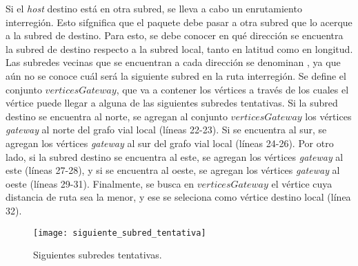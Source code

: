 Si el \textit{host} destino está en otra subred, se lleva a cabo un
enrutamiento interregión. Esto sifgnifica que el paquete debe pasar a otra
subred que lo acerque a la subred de destino. Para esto, se debe conocer en qué
dirección se encuentra la subred de destino respecto a la subred local, tanto
en latitud como en longitud. Las subredes vecinas que se encuentran a cada
dirección se denominan , ya que aún no
se conoce cuál será la siguiente subred en la ruta interregión. Se define el
conjunto $verticesGateway$, que va a contener los vértices a través de los
cuales el vértice puede llegar a alguna de las siguientes subredes tentativas.
Si la subred destino se encuentra al norte, se agregan al conjunto
$verticesGateway$ los vértices \textit{gateway} al norte del grafo vial local
(líneas 22-23). Si se encuentra al sur, se agregan los vértices
\textit{gateway} al sur del grafo vial local (líneas 24-26). Por otro lado, si
la subred destino se encuentra al este, se agregan los vértices
\textit{gateway} al este (líneas 27-28), y si se encuentra al oeste, se agregan
los vértices \textit{gateway} al oeste (líneas 29-31). Finalmente, se busca en
$verticesGateway$ el vértice cuya distancia de ruta sea la menor, y ese se
seleciona como vértice destino local (línea 32).

\begin{figure}[th!]
\centering
\texttt{[image: siguiente\_subred\_tentativa]}
\decoRule
\caption[Siguientes subredes tentativas]{Siguientes subredes tentativas.}
\label{fig:siguiente_subred_tentativa}
\end{figure}

